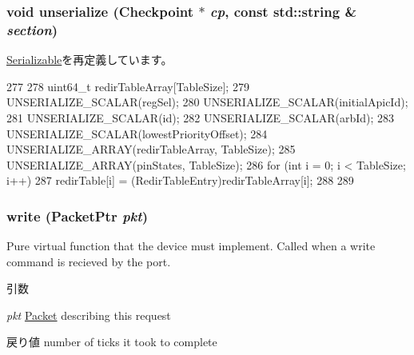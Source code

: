 \hypertarget{classX86ISA_1_1I82094AA_af22e5d6d660b97db37003ac61ac4ee49}{
\subsubsection[{unserialize}]{\setlength{\rightskip}{0pt plus 5cm}void unserialize ({\bf Checkpoint} $\ast$ {\em cp}, \/  const std::string \& {\em section})}}
\label{classX86ISA_1_1I82094AA_af22e5d6d660b97db37003ac61ac4ee49}


\hyperlink{classSerializable_af100c4e9feabf3cd918619c88c718387}{Serializable}を再定義しています。


\begin{DoxyCode}
277 {
278     uint64_t redirTableArray[TableSize];
279     UNSERIALIZE_SCALAR(regSel);
280     UNSERIALIZE_SCALAR(initialApicId);
281     UNSERIALIZE_SCALAR(id);
282     UNSERIALIZE_SCALAR(arbId);
283     UNSERIALIZE_SCALAR(lowestPriorityOffset);
284     UNSERIALIZE_ARRAY(redirTableArray, TableSize);
285     UNSERIALIZE_ARRAY(pinStates, TableSize);
286     for (int i = 0; i < TableSize; i++) {
287         redirTable[i] = (RedirTableEntry)redirTableArray[i];
288     }
289 }
\end{DoxyCode}
\hypertarget{classX86ISA_1_1I82094AA_a4cefab464e72b5dd42c003a0a4341802}{
\subsubsection[{write}]{ write ({\bf PacketPtr} {\em pkt})}}
\label{classX86ISA_1_1I82094AA_a4cefab464e72b5dd42c003a0a4341802}
Pure virtual function that the device must implement. Called when a write command is recieved by the port. 
\begin{DoxyParams}{引数}
\item[{\em pkt}]\hyperlink{classPacket}{Packet} describing this request \end{DoxyParams}
\begin{DoxyReturn}{戻り値}
number of ticks it took to complete 
\end{DoxyReturn}


